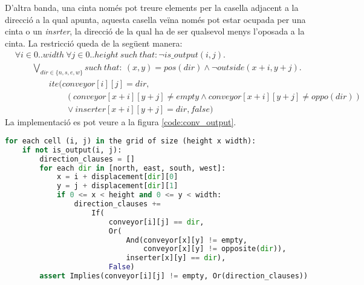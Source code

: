 D'altra banda, una cinta només pot treure elements per la casella adjacent a la direcció a la qual apunta, aquesta casella veïna només pot estar ocupada per una cinta o un \textit{insrter}, la direcció de la qual ha de ser qualsevol menys l'oposada a la cinta. La restricció queda de la següent manera:
\begin{align*}
    & \forall i \in 0..width \ \forall j \in 0..height \ such \ that: \neg is\_output(i, j). \\
    & \qquad \bigvee_{dir \in \{n, s, e, w\}} such \ that: \ (x, y)=pos(dir) \land \neg outside(x+i, y+j).\\
    & \qquad \qquad ite\Big(conveyor[i][j]=dir, \\
    & \qquad \qquad \qquad (conveyor[x+i][y+j] \neq empty \land conveyor[x+i][y+j] \neq oppo(dir))\\
    & \qquad \qquad \qquad \lor inserter[x+i][y+j]=dir,false\Big)
\end{align*}
La implementació es pot veure a la figura \ref{code:conv_output}.
\begin{lstlisting}[language=Python, caption=Conveyor Output, label=code:conv_output]
for each cell (i, j) in the grid of size (height x width):
    if not is_output(i, j):
        direction_clauses = []
        for each dir in [north, east, south, west]:
            x = i + displacement[dir][0]
            y = j + displacement[dir][1]
            if 0 <= x < height and 0 <= y < width:
                direction_clauses += 
                    If(
                        conveyor[i][j] == dir,
                        Or(
                            And(conveyor[x][y] != empty,
                                conveyor[x][y] != opposite(dir)),
                            inserter[x][y] == dir),
                        False)
        assert Implies(conveyor[i][j] != empty, Or(direction_clauses))
\end{lstlisting}

